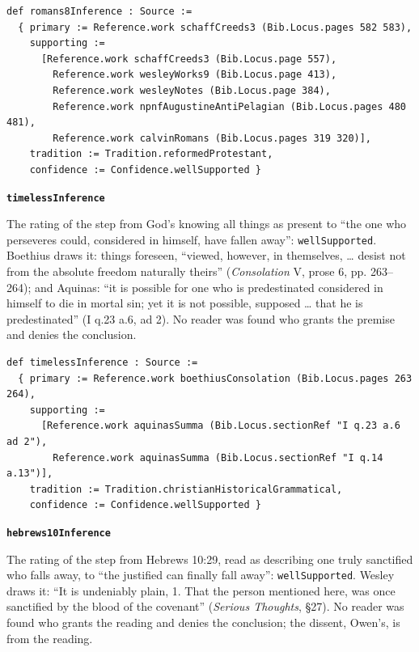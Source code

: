 \documentclass[11pt]{article}
\begin{document}
{\small\begin{verbatim}
def romans8Inference : Source :=
  { primary := Reference.work schaffCreeds3 (Bib.Locus.pages 582 583),
    supporting :=
      [Reference.work schaffCreeds3 (Bib.Locus.page 557),
        Reference.work wesleyWorks9 (Bib.Locus.page 413),
        Reference.work wesleyNotes (Bib.Locus.page 384),
        Reference.work npnfAugustineAntiPelagian (Bib.Locus.pages 480 481),
        Reference.work calvinRomans (Bib.Locus.pages 319 320)],
    tradition := Tradition.reformedProtestant,
    confidence := Confidence.wellSupported }
\end{verbatim}}
\par\medskip\noindent\textbf{\texttt{timeless\allowbreak{}Inference}}\par\nobreak\noindent
The rating of the step from God’s knowing all things as present to “the one who perseveres could, considered in himself, have fallen away”: \texttt{well\allowbreak{}Supported}. Boethius draws it: things foreseen, “viewed, however, in themselves, … desist not from the absolute freedom naturally theirs” (\emph{Consolation} V, prose 6, pp. 263–264); and Aquinas: “it is possible for one who is predestinated considered in himself to die in mortal sin; yet it is not possible, supposed … that he is predestinated” (I q.23 a.6, ad 2). No reader was found who grants the premise and denies the conclusion.

{\small\begin{verbatim}
def timelessInference : Source :=
  { primary := Reference.work boethiusConsolation (Bib.Locus.pages 263 264),
    supporting :=
      [Reference.work aquinasSumma (Bib.Locus.sectionRef "I q.23 a.6 ad 2"),
        Reference.work aquinasSumma (Bib.Locus.sectionRef "I q.14 a.13")],
    tradition := Tradition.christianHistoricalGrammatical,
    confidence := Confidence.wellSupported }
\end{verbatim}}
\par\medskip\noindent\textbf{\texttt{hebrews10\allowbreak{}Inference}}\par\nobreak\noindent
The rating of the step from Hebrews 10:29, read as describing one truly sanctified who falls away, to “the justified can finally fall away”: \texttt{well\allowbreak{}Supported}. Wesley draws it: “It is undeniably plain, 1. That the person mentioned here, was once sanctified by the blood of the covenant” (\emph{Serious Thoughts}, §27). No reader was found who grants the reading and denies the conclusion; the dissent, Owen’s, is from the reading.
\end{document}
